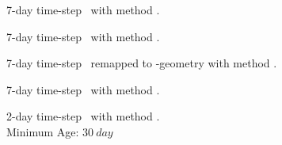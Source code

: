 \begin{fullwidth}
\begin{multicols}{2}
\begin{definition}\label{def:aviI}
7-day time-step \AVI~with method \MI.
\end{definition}
\begin{definition}\label{def:aviII}
7-day time-step \AVI~with method \MII.
\end{definition}
\begin{definition}\label{def:p2aII}
7-day time-step \POP~remapped to \AVI-geometry with method \MII.
\end{definition}
\begin{definition}\label{def:pop7II}
7-day time-step \POP~with method \MII.
\end{definition}
\begin{definition}\label{def:pop2II}
2-day time-step \POP~with method \MII. \\Minimum Age: $\SI{30}{day}$ 
\end{definition}


\end{multicols}
\end{fullwidth}
